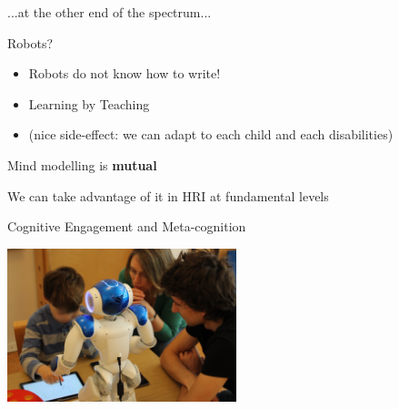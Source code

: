 \documentclass[compress]{beamer}
\begin{document}
 \begin{frame}[plain]{}
     ...at the other end of the spectrum...
 \end{frame}






\begin{frame}{Robots?}
    \begin{itemize}
        \item<1-> Robots do not know how to write!
        \item<2-> Learning by Teaching
        \item<3-> (nice side-effect: we can adapt to each child and each disabilities)
    \end{itemize}
\end{frame}


\begin{frame}[plain]{}
    \centering
    Mind modelling is {\bf mutual}

    We can take advantage of it in HRI at fundamental levels

\end{frame}

{
\begin{frame}{Cognitive Engagement and Meta-cognition}

    \begin{flushright}
        \includegraphics[width=0.5\textwidth]{cowriter/henry}
    \end{flushright}

\end{frame}
}
\end{document}
